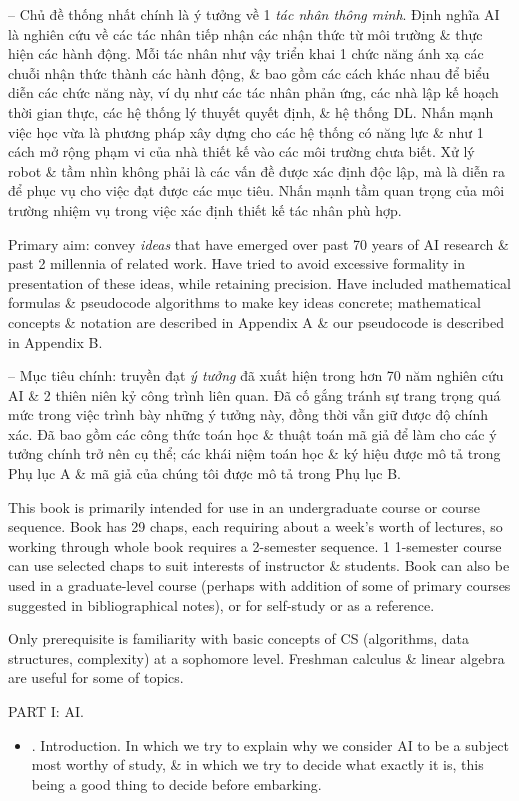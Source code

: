 \documentclass{article}
\begin{document}
\begin{itemize}
\begin{itemize}
		-- Chủ đề thống nhất chính là ý tưởng về 1 {\it tác nhân thông minh}. Định nghĩa AI là nghiên cứu về các tác nhân tiếp nhận các nhận thức từ môi trường \& thực hiện các hành động. Mỗi tác nhân như vậy triển khai 1 chức năng ánh xạ các chuỗi nhận thức thành các hành động, \& bao gồm các cách khác nhau để biểu diễn các chức năng này, ví dụ như các tác nhân phản ứng, các nhà lập kế hoạch thời gian thực, các hệ thống lý thuyết quyết định, \& hệ thống DL. Nhấn mạnh việc học vừa là phương pháp xây dựng cho các hệ thống có năng lực \& như 1 cách mở rộng phạm vi của nhà thiết kế vào các môi trường chưa biết. Xử lý robot \& tầm nhìn không phải là các vấn đề được xác định độc lập, mà là diễn ra để phục vụ cho việc đạt được các mục tiêu. Nhấn mạnh tầm quan trọng của môi trường nhiệm vụ trong việc xác định thiết kế tác nhân phù hợp.
		
		Primary aim: convey {\it ideas} that have emerged over past 70 years of AI research \& past 2 millennia of related work. Have tried to avoid excessive formality in presentation of these ideas, while retaining precision. Have included mathematical formulas \& pseudocode algorithms to make key ideas concrete; mathematical concepts \& notation are described in Appendix A \& our pseudocode is described in Appendix B.
		
		-- Mục tiêu chính: truyền đạt {\it ý tưởng} đã xuất hiện trong hơn 70 năm nghiên cứu AI \& 2 thiên niên kỷ công trình liên quan. Đã cố gắng tránh sự trang trọng quá mức trong việc trình bày những ý tưởng này, đồng thời vẫn giữ được độ chính xác. Đã bao gồm các công thức toán học \& thuật toán mã giả để làm cho các ý tưởng chính trở nên cụ thể; các khái niệm toán học \& ký hiệu được mô tả trong Phụ lục A \& mã giả của chúng tôi được mô tả trong Phụ lục B.
		
		This book is primarily intended for use in an undergraduate course or course sequence. Book has 29 chaps, each requiring about a week's worth of lectures, so working through whole book requires a 2-semester sequence. 1 1-semester course can use selected chaps to suit interests of instructor \& students. Book can also be used in a graduate-level course (perhaps with addition of some of primary courses suggested in bibliographical notes), or for self-study or as a reference.
		
		Only prerequisite is familiarity with basic concepts of CS (algorithms, data structures, complexity) at a sophomore level. Freshman calculus \& linear algebra are useful for some of topics.
	\end{itemize}
	PART I: AI.
	\begin{itemize}
		\item {. Introduction.} In which we try to explain why we consider AI to be a subject most worthy of study, \& in which we try to decide what exactly it is, this being a good thing to decide before embarking.
		

\end{itemize}
\end{itemize}
\end{document}
